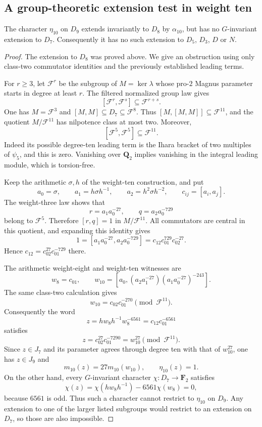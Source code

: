\subsection{A group-theoretic extension test in weight ten}
\label{subsec:eta-ten-extension-threshold}

\begin{proposition}\label{prop:eta-ten-no-extension-d7}
The character $\eta_{10}$ on $D_9$ extends invariantly to $D_8$
by $\alpha_{10}$, but has no $G$-invariant extension to $D_7$.
Consequently it has no such extension to $D_5$, $D_3$, $D$ or $N$.
\end{proposition}

\begin{proof}
The extension to $D_8$ was proved above. We give an obstruction
using only class-two commutator identities and the previously
established leading terms.

For $r\ge3$, let $\mathcal F^r$ be the subgroup of
$M=\ker\lambda$ whose pro-$2$ Magnus parameter starts in degree
at least $r$. The filtered normalized group law gives
\[
 [\mathcal F^r,\mathcal F^s]\subseteq\mathcal F^{r+s}.
\]
One has $M=\mathcal F^3$ and
$[M,M]\subseteq D_7\subseteq\mathcal F^8$. Thus
$[M,[M,M]]\subseteq\mathcal F^{11}$, and the quotient
$M/\mathcal F^{11}$ has nilpotence class at most two.
Moreover,
\[
 [\mathcal F^5,\mathcal F^5]\subseteq\mathcal F^{11}.
\]
Indeed its possible degree-ten leading term is the Ihara bracket
of two multiples of $\psi_5$, and this is zero. Vanishing over
$\mathbf Q_2$ implies vanishing in the integral leading module,
which is torsion-free.

Keep the arithmetic $\sigma,h$ of the weight-ten construction, and
put
\[
 a_0=\sigma,\qquad a_1=h\sigma h^{-1},\qquad
 a_2=h^2\sigma h^{-2},\qquad c_{ij}=[a_i,a_j].
\]
The weight-three law shows that
\[
 r=a_1a_0^{-27},\qquad q=a_2a_0^{-729}
\]
belong to $\mathcal F^5$. Therefore $[r,q]=1$ in
$M/\mathcal F^{11}$. All commutators are central in this quotient,
and expanding this identity gives
\[
 1=[a_1a_0^{-27},a_2a_0^{-729}]
   =c_{12}c_{01}^{729}c_{02}^{-27}.
\]
Hence $c_{12}=c_{02}^{27}c_{01}^{-729}$ there.

The arithmetic weight-eight and weight-ten witnesses are
\[
 w_8=c_{01},\qquad
 w_{10}=[a_0,(a_2a_1^{-27})(a_1a_0^{-27})^{-243}].
\]
The same class-two calculation gives
\[
 w_{10}=c_{02}c_{01}^{-270}\pmod{\mathcal F^{11}}.
\]
Consequently the word
\[
 z=h w_8h^{-1}w_8^{-6561}=c_{12}c_{01}^{-6561}
\]
satisfies
\[
 z=c_{02}^{27}c_{01}^{-7290}
   =w_{10}^{27}\pmod{\mathcal F^{11}}.
\]
Since $z\in J_7$ and its parameter agrees through degree ten with
that of $w_{10}^{27}$, one has $z\in J_9$ and
\[
 m_{10}(z)=27m_{10}(w_{10}),\qquad\eta_{10}(z)=1.
\]
On the other hand, every $G$-invariant character
$\chi:D_7\to\mathbf F_2$ satisfies
\[
 \chi(z)=\chi(h w_8h^{-1})-6561\chi(w_8)=0,
\]
because $6561$ is odd. Thus such a character cannot restrict to
$\eta_{10}$ on $D_9$. Any extension to one of the larger listed
subgroups would restrict to an extension on $D_7$, so those are
also impossible.
\end{proof}

